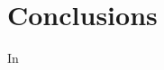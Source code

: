 \chapter{Conclusions} %
\label{chap:conc}



\ifpdf
    \graphicspath{{Conc/fig/PNG/}{Conc/fig/PDF/}{Conc/fig/}}
\else
    \graphicspath{{Conc/fig/EPS/}{Conc/fig/}}
\fi

In~\cite{}



